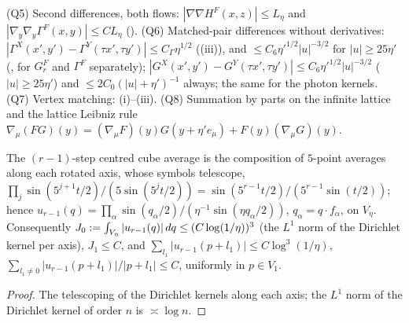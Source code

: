 (Q5) Second differences, both flows: $|\nabla\nabla H^F(x,z)|\le L_\eta$ and $|\nabla_y\nabla_y\Gamma^F(x,y)|\le CL_\eta$ ().
(Q6) Matched-pair differences without derivatives: $|\Gamma^X(x',y')-\Gamma^Y(\tau x',\tau y')|\le C_\Gamma\eta^{1/2}$ ((iii)), and $\le C_6\eta'^{1/2}|u|^{-3/2}$ for $|u|\ge25\eta'$ (, for $G^F_r$ and $\Gamma^F$ separately); $|G^X(x',y')-G^Y(\tau x',\tau y')|\le C_6\eta'^{1/2}|u|^{-3/2}$ ($|u|\ge25\eta'$) and $\le2C_0(|u|+\eta')^{-1}$ always; the same for the photon kernels.
(Q7) Vertex matching: (i)--(iii). (Q8) Summation by parts on the infinite lattice and the lattice Leibniz rule $\nabla_\mu(FG)(y)=(\nabla_\mu F)(y)G(y+\eta'e_\mu)+F(y)(\nabla_\mu G)(y)$.

\begin{lemma}\label{rot:lem:CK0}
The $(r-1)$-step centred cube average is the composition of $5$-point averages along each rotated axis, whose symbols telescope, $\prod_j\sin(5^{j+1}t/2)/(5\sin(5^jt/2))=\sin(5^{r-1}t/2)/(5^{r-1}\sin(t/2))$; hence $u_{r-1}(q)=\prod_\alpha\sin(q_\alpha/2)/(\eta^{-1}\sin(\eta q_\alpha/2))$, $q_\alpha=q\cdot f_\alpha$, on $V_\eta$. Consequently $J_0:=\int_{V_\eta}|u_{r-1}(q)|\,dq\le(C\log(1/\eta))^3$ (the $L^1$ norm of the Dirichlet kernel per axis), $J_1\le C$, and $\sum_{l_1}|u_{r-1}(p+l_1)|\le C\log^3(1/\eta)$, $\sum_{l_1\ne0}|u_{r-1}(p+l_1)|/|p+l_1|\le C$, uniformly in $p\in V_1$.
\end{lemma}
\begin{proof}
The telescoping of the Dirichlet kernels along each axis; the $L^1$ norm of the Dirichlet kernel of order $n$ is $\asymp\log n$.
\end{proof}


